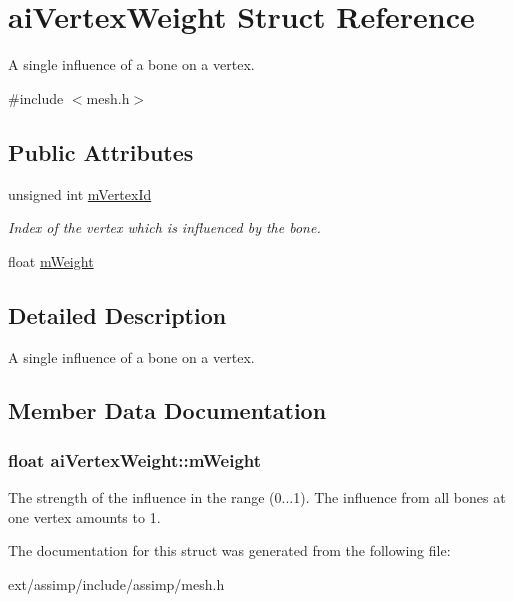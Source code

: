 \hypertarget{structai_vertex_weight}{\section{ai\-Vertex\-Weight Struct Reference}
\label{structai_vertex_weight}
}


A single influence of a bone on a vertex.  




{\ttfamily \#include $<$mesh.\-h$>$}

\subsection*{Public Attributes}
\begin{DoxyCompactItemize}
\item 
\hypertarget{structai_vertex_weight_af6269cf6a0f02e5ae870a72046d58f4f}{unsigned int \hyperlink{structai_vertex_weight_af6269cf6a0f02e5ae870a72046d58f4f}{m\-Vertex\-Id}}\label{structai_vertex_weight_af6269cf6a0f02e5ae870a72046d58f4f}

\begin{DoxyCompactList}\small\item\em Index of the vertex which is influenced by the bone. \end{DoxyCompactList}\item 
float \hyperlink{structai_vertex_weight_abab9c49baabc2cafef9ac840f59e61b8}{m\-Weight}
\end{DoxyCompactItemize}


\subsection{Detailed Description}
A single influence of a bone on a vertex. 

\subsection{Member Data Documentation}
\hypertarget{structai_vertex_weight_abab9c49baabc2cafef9ac840f59e61b8}{
\subsubsection[{m\-Weight}]{\setlength{\rightskip}{0pt plus 5cm}float ai\-Vertex\-Weight\-::m\-Weight}}\label{structai_vertex_weight_abab9c49baabc2cafef9ac840f59e61b8}
The strength of the influence in the range (0...1). The influence from all bones at one vertex amounts to 1. 

The documentation for this struct was generated from the following file\-:\begin{DoxyCompactItemize}
\item 
ext/assimp/include/assimp/mesh.\-h\end{DoxyCompactItemize}
